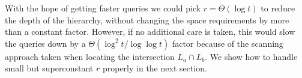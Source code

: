 With the hope of getting faster queries we could pick \(r = \Theta(\log
t)\) to reduce the depth of the hierarchy, without changing the
space requirements by more than a constant factor.
However, if no additional care is taken, this would slow the queries down by a
\(\Theta(\log^2 t / \log \log t)\) factor because of the scanning approach
taken when locating the intersection \(L_a \cap L_b\). We show how to handle
small but superconstant \(r\) properly in the next section.
